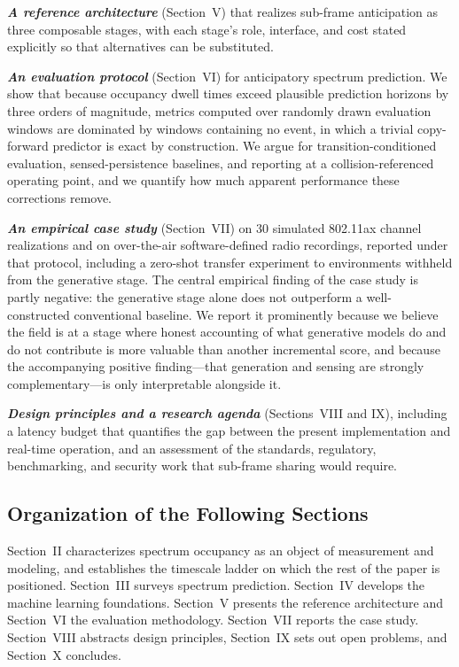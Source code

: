 \documentclass[lettersize,journal]{IEEEtran}
\begin{document}
\textbf{\emph{A reference architecture}} (Section~V) that realizes
sub-frame anticipation as three composable stages, with each stage's
role, interface, and cost stated explicitly so that alternatives can be
substituted.

\textbf{\emph{An evaluation protocol}} (Section~VI) for
anticipatory spectrum prediction. We show that because occupancy dwell
times exceed plausible prediction horizons by three orders of magnitude,
metrics computed over randomly drawn evaluation windows are dominated by
windows containing no event, in which a trivial copy-forward predictor
is exact by construction. We argue for transition-conditioned
evaluation, sensed-persistence baselines, and reporting at a
collision-referenced operating point, and we quantify how much
apparent performance these corrections remove.

\textbf{\emph{An empirical case study}} (Section~VII) on 30 simulated
802.11ax channel realizations and on over-the-air software-defined radio
recordings, reported under that protocol, including a zero-shot transfer
experiment to environments withheld from the generative stage.
The central empirical finding of
the case study is partly negative: the generative stage alone does not
outperform a well-constructed conventional baseline. We report it
prominently because we believe the field is at a stage where honest
accounting of what generative models do and do not contribute is more
valuable than another incremental score, and because the accompanying
positive finding---that generation and sensing are strongly
complementary---is only interpretable alongside it.

\textbf{\emph{Design principles and a research agenda}}
(Sections~VIII and IX), including a latency budget that quantifies
the gap between the present implementation and real-time operation, and
an assessment of the standards, regulatory, benchmarking, and security
work that sub-frame sharing would require.

\subsection{\textbf{Organization of the Following Sections}}
Section~II characterizes spectrum occupancy as an object of
measurement and modeling, and establishes the timescale ladder on which
the rest of the paper is positioned. Section~III surveys spectrum
prediction. Section~IV develops the machine learning foundations.
Section~V presents the reference architecture and Section~VI the
evaluation methodology. Section~VII reports the case study.
Section~VIII abstracts design principles, Section~IX sets out
open problems, and Section~X concludes.
\end{document}
